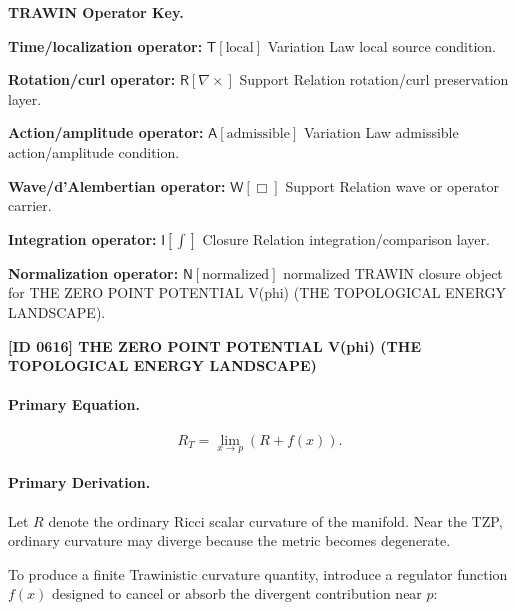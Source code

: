 \par\vspace{0.45\baselineskip}
\noindent\begin{minipage}[t]{\linewidth}
\begingroup
\small
\raggedright
\textbf{TRAWIN Operator Key.}\par
\noindent\textbf{Time/localization operator:} $\mathsf{T}\!\left[\mathrm{local}\right]$ Variation Law local source condition.\par
\noindent\textbf{Rotation/curl operator:} $\mathsf{R}\!\left[\nabla\times\right]$ Support Relation rotation/curl preservation layer.\par
\noindent\textbf{Action/amplitude operator:} $\mathsf{A}\!\left[\mathrm{admissible}\right]$ Variation Law admissible action/amplitude condition.\par
\noindent\textbf{Wave/d'Alembertian operator:} $\mathsf{W}\!\left[\Box\right]$ Support Relation wave or operator carrier.\par
\noindent\textbf{Integration operator:} $\mathsf{I}\!\left[\int\right]$ Closure Relation integration/comparison layer.\par
\noindent\textbf{Normalization operator:} $\mathsf{N}\!\left[\mathrm{normalized}\right]$ normalized TRAWIN closure object for THE ZERO POINT POTENTIAL V(phi) (THE TOPOLOGICAL ENERGY LANDSCAPE).\par
\endgroup
\end{minipage}

\clearpage
\noindent\textbf{[ID 0616] THE ZERO POINT POTENTIAL V(phi) (THE TOPOLOGICAL ENERGY LANDSCAPE)}\par
\vspace{0.35em}
\paragraph{Primary Equation.}
\begin{equation}
R_T
=
\lim_{x\to p}
\left(
R+f(x)
\right).
\end{equation}

\paragraph{Primary Derivation.}
Let $R$ denote the ordinary Ricci scalar curvature of the manifold.  
Near the TZP, ordinary curvature may diverge because the metric becomes degenerate.

To produce a finite Trawinistic curvature quantity, introduce a regulator function $f(x)$ designed to cancel or absorb the divergent contribution near $p$:

